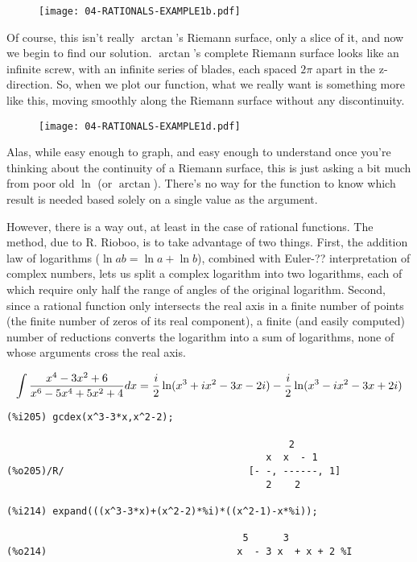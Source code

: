 \begin{figure}[h]
\begin{center}
\texttt{[image: 04-RATIONALS-EXAMPLE1b.pdf]}
\end{center}
\end{figure}

Of course, this isn't really $\arctan$'s Riemann surface, only a slice
of it, and now we begin to find our solution.  $\arctan$'s complete
Riemann surface looks like an infinite screw, with an infinite series
of blades, each spaced $2\pi$ apart in the z-direction.  So, when we
plot our function, what we really want is something more like this,
moving smoothly along the Riemann surface without any discontinuity.

\begin{figure}[h]
\begin{center}
\texttt{[image: 04-RATIONALS-EXAMPLE1d.pdf]}
\end{center}
\end{figure}

Alas, while easy enough to graph, and easy enough to understand once
you're thinking about the continuity of a Riemann surface, this is
just asking a bit much from poor old $\ln$ (or $\arctan$).  There's no
way for the function to know which result is needed based solely on a
single value as the argument.

However, there is a way out, at least in the case of rational
functions.  The method, due to R. Rioboo, is to take advantage of two
things.  First, the addition law of logarithms ($\ln ab = \ln a + \ln
b$), combined with Euler-?? interpretation of complex numbers, lets us
split a complex logarithm into two logarithms, each of which require
only half the range of angles of the original logarithm.  Second,
since a rational function only intersects the real axis in a finite
number of points (the finite number of zeros of its real component), a
finite (and easily computed) number of reductions converts the
logarithm into a sum of logarithms, none of whose arguments cross
the real axis.

\vfill\eject

$$\int {{x^4-3x^2+6}\over{x^6-5x^4+5x^2+4}} dx =
   {i\over2}\ln(x^3+ix^2-3x-2i) - {i\over2}\ln(x^3-ix^2-3x+2i)$$

{\small\begin{verbatim}
(%i205) gcdex(x^3-3*x,x^2-2);

                                                 2
                                             x  x  - 1
(%o205)/R/                                [- -, ------, 1]
                                             2    2

(%i214) expand(((x^3-3*x)+(x^2-2)*%i)*((x^2-1)-x*%i));

                                         5      3
(%o214)                                 x  - 3 x  + x + 2 %I
\end{verbatim}}

